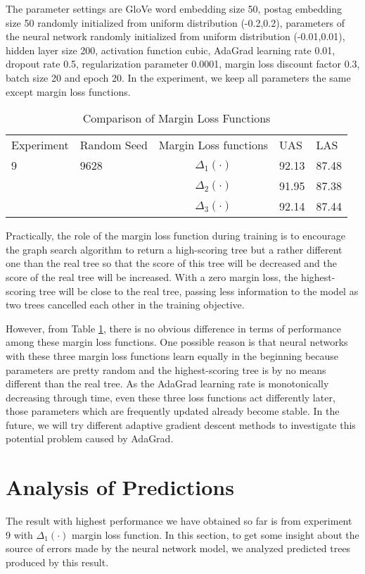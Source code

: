 The parameter settings are GloVe word embedding size 50, postag embedding size 50 randomly initialized from uniform distribution (-0.2,0.2), parameters of the neural network randomly initialized from uniform distribution (-0.01,0.01), hidden layer size 200, activation function cubic, AdaGrad learning rate 0.01, dropout rate 0.5, regularization parameter 0.0001, margin loss discount factor 0.3, batch size 20 and epoch 20. In the experiment, we keep all parameters the same except margin loss functions. 
\begin{table}
\centering
    \begin{tabular}{@{}l l|c l l @{}} \toprule
    Experiment&Random Seed&Margin Loss functions& UAS & LAS \\  
    9&9628&$\Delta_1(\cdot)$& 92.13 & 87.48\\  
    &&$\Delta_2(\cdot)$& 91.95& 87.38\\  
    &&$\Delta_3(\cdot)$& 92.14& 87.44\\  
    \bottomrule
    \end{tabular}  
\caption{Comparison of Margin Loss Functions}\label{tab:maglos}
\end{table}

Practically, the role of the margin loss function during training is to encourage the graph search algorithm to return a high-scoring tree but a rather different one than the real tree so that the score of this tree will be decreased and the score of the real tree will be increased. With a zero margin loss, the highest-scoring tree will be close to the real tree, passing less information to the model as two trees cancelled each other in the training objective. 

However, from Table \ref{tab:maglos}, there is no obvious difference in terms of performance among these margin loss functions. One possible reason is that neural networks with these three margin loss functions learn equally in the beginning because parameters are pretty random and the highest-scoring tree is by no means different than the real tree. As the AdaGrad learning rate is monotonically decreasing through time, even these three loss functions act differently later, those parameters which are frequently updated already become stable. In the future, we will try different adaptive gradient descent methods to investigate this potential problem caused by AdaGrad.

\section{Analysis of Predictions}
\label{sec:Anpred}
The result with highest performance we have obtained so far is from experiment 9 with $\Delta_1(\cdot)$ margin loss function. In this section, to get some insight about the source of errors made by the neural network model, we analyzed predicted trees produced by this result.  

